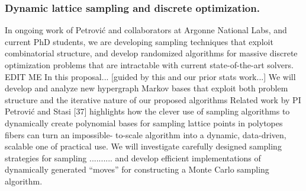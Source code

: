\documentclass[11pt]{NSFamsart}
\begin{document}
 \subsubsection*{Dynamic lattice sampling and discrete optimization.} 
In ongoing work of Petrovi\'c and collaborators at Argonne National Labs, and current PhD students, we are developing sampling techniques that exploit combinatorial structure, and develop randomized algorithms for massive discrete optimization problems that are intractable with current state-of-the-art solvers. 
{\color{magenta}EDIT ME} In this proposal... [guided by this and our prior stats work...] We will develop and analyze new hypergraph Markov bases that exploit both problem structure and the iterative nature of our proposed algorithms 
Related work by PI Petrovi\'c and Stasi [37] highlights how the clever use of
sampling algorithms to dynamically create polynomial bases for
sampling lattice points in polytopes fibers can turn an impossible-
to-scale algorithm into a dynamic, data-driven, scalable one of practical use. 
We will investigate carefully designed sampling strategies for sampling .......... and develop efficient implementations of dynamically generated “moves” for constructing a Monte Carlo sampling algorithm.
\end{document}
